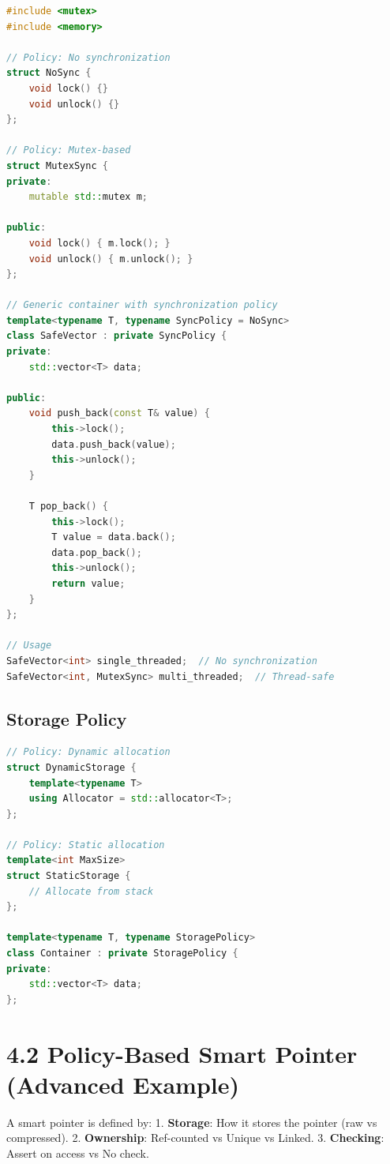 \begin{lstlisting}[language={C++}]
#include <mutex>
#include <memory>

// Policy: No synchronization
struct NoSync {
    void lock() {}
    void unlock() {}
};

// Policy: Mutex-based
struct MutexSync {
private:
    mutable std::mutex m;
    
public:
    void lock() { m.lock(); }
    void unlock() { m.unlock(); }
};

// Generic container with synchronization policy
template<typename T, typename SyncPolicy = NoSync>
class SafeVector : private SyncPolicy {
private:
    std::vector<T> data;
    
public:
    void push_back(const T& value) {
        this->lock();
        data.push_back(value);
        this->unlock();
    }
    
    T pop_back() {
        this->lock();
        T value = data.back();
        data.pop_back();
        this->unlock();
        return value;
    }
};

// Usage
SafeVector<int> single_threaded;  // No synchronization
SafeVector<int, MutexSync> multi_threaded;  // Thread-safe
\end{lstlisting}

\hypertarget{storage-policy}{%
\subsection{Storage Policy}\label{storage-policy}}

\begin{lstlisting}[language={C++}]
// Policy: Dynamic allocation
struct DynamicStorage {
    template<typename T>
    using Allocator = std::allocator<T>;
};

// Policy: Static allocation
template<int MaxSize>
struct StaticStorage {
    // Allocate from stack
};

template<typename T, typename StoragePolicy>
class Container : private StoragePolicy {
private:
    std::vector<T> data;
};
\end{lstlisting}

\hypertarget{policy-based-smart-pointer-advanced-example}{%
\section{4.2 Policy-Based Smart Pointer (Advanced
Example)}\label{policy-based-smart-pointer-advanced-example}}

A smart pointer is defined by: 1. \textbf{Storage}: How it stores the
pointer (raw vs compressed). 2. \textbf{Ownership}: Ref-counted vs
Unique vs Linked. 3. \textbf{Checking}: Assert on access vs No check.

